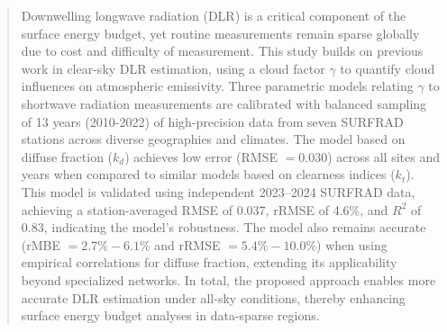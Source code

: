 \documentclass[preprint,12pt]{elsarticle}
\begin{document}
\begin{frontmatter}
\begin{abstract}
Downwelling longwave radiation (DLR) is a critical component of the surface energy budget, yet routine measurements remain sparse globally due to cost and difficulty of measurement. 
This study builds on previous work in clear-sky DLR estimation, using a cloud factor $\gamma$ to quantify cloud influences on atmospheric emissivity. Three parametric models relating $\gamma$ to shortwave radiation measurements are calibrated with balanced sampling of 13 years (2010-2022) of high-precision data from seven SURFRAD stations across diverse geographies and climates. The model based on diffuse fraction ($k_d$) achieves low error (RMSE $=0.030$) across all sites and years when compared to similar models based on clearness indices ($k_t$). This model is validated using independent 2023–2024 SURFRAD data, achieving a station-averaged RMSE of 0.037, rRMSE of 4.6\%, and $R^2$ of 0.83, indicating the model's robustness. The model also remains accurate (rMBE $= 2.7 \% -6.1 \%$ and rRMSE $= 5.4 \% - 10.0 \%$) when using empirical correlations for diffuse fraction, extending its applicability beyond specialized networks. In total, the proposed approach enables more accurate DLR estimation under all-sky conditions, thereby enhancing surface energy budget analyses in data-sparse regions.


\end{abstract}
\end{frontmatter}
\end{document}
